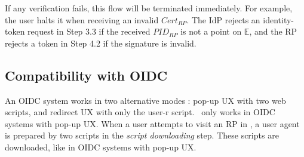 If any verification fails, this flow will be terminated immediately.
For example, the user halts it when receiving an invalid $Cert_{RP}$.
The IdP rejects an identity-token request in Step 3.3 if the received $PID_{RP}$ is not a point on $\mathbb{E}$, and the RP rejects a token in Step 4.2 if the signature is invalid. 

%

\subsection{Compatibility with OIDC}
\label{subsec:compatible}

An OIDC system works in two alternative modes \cite{dimvaLiM16,GoogleIdIntegrate,uber,de2014oauth}:
 pop-up UX with two web scripts, and redirect UX with only the user-r script.
\usso\ only works in OIDC systems with pop-up UX. %
%
When a user attempts to visit an RP in \usso,
        a user agent is prepared by two scripts in the \emph{script downloading} step.
These scripts are downloaded, %
like in OIDC systems with pop-up UX.
%
%

